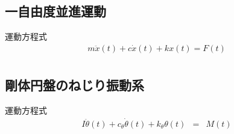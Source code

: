 \documentclass[a4paper]{jsarticle}
\begin{document}
\subsection{一自由度並進運動}
\begin{itembox}[l]{運動方程式}
    \begin{eqnarray*}
        m\ddot{x}\left(t\right)+c\dot{x}\left(t\right)+kx\left(t\right)=F\left(t\right)\\
    \end{eqnarray*}
\end{itembox}
\subsection{剛体円盤のねじり振動系}
\begin{itembox}[l]{運動方程式}
    \begin{eqnarray*}
        I\ddot{\theta}\left(t\right)+c_\theta\dot{\theta}\left(t\right)+k_\theta\theta\left(t\right)&=&M\left(t\right)\\
    \end{eqnarray*}
\end{itembox}
\end{document}
